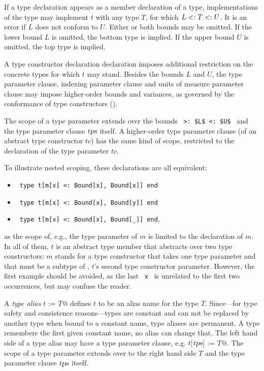 If a type declaration appears as a member declaration of a type, implementations of the type may implement $t$ with any type $T$, for which $L <: T <: U$. It is an error if $L$ does not conform to $U$. Either or both bounds may be omitted. If the lower bound $L$ is omitted, the bottom type  is implied. If the upper bound $U$ is omitted, the top type  is implied. 

A type constructor declaration declaration imposes additional restriction on the concrete types for which $t$ may stand. Besides the bounds $L$ and $U$, the type parameter clause, indexing parameter clause and units of measure parameter clause may impose higher-order bounds and variances, as governed by the conformance of type constructors ().

The scope of a type parameter extends over the bounds ~\lstinline!>: $L$ <: $U$!~ and the type parameter clause $\mbox{\sl tps}$ itself. A higher-order type parametre clause (of an abstract type constructor $tc$) has the same kind of scope, restricted to the declaration of the type parameter $tc$. 

To illustrate nested scoping, these declarations are all equivalent: 
\begin{itemize}
\item[]
~\lstinline!type t[m[x] <: Bound[x], Bound[x]] end! 

\item[]
~\lstinline!type t[m[x] <: Bound[x], Bound[y]] end!

\item[]
~\lstinline!type t[m[x] <: Bound[x], Bound[_]] end!,
\end{itemize} 
as the scope of, e.g., the type parameter of $m$ is limited to the declaration of $m$. In all of them, $t$ is an abstract type member that abstracts over two type constructors: $m$ stands for a type constructor that takes one type parameter and that must be a subtype of , $t$'s second type constructor parameter. However, the first example should be avoided, as the last ~\lstinline!x!~ is unrelated to the first two occurrences, but may confuse the reader. 

A {\em type alias} \lstinline@type $t$ := $T$@ defines $t$ to be an alias name for the type $T$. Since---for type safety and consistence reasons---types are constant and can not be replaced by another type when bound to a constant name, type aliases are permanent. A type remembers the first given constant name, no alias can change that. The left hand side of a type alias may have a type parameter clause, e.g. \lstinline@type $t$[$\mbox{\sl tps}$] := $T$@. The scope of a type parameter extends over to the right hand side $T$ and the type parameter clause $\mbox{\sl tps}$ itself. 

